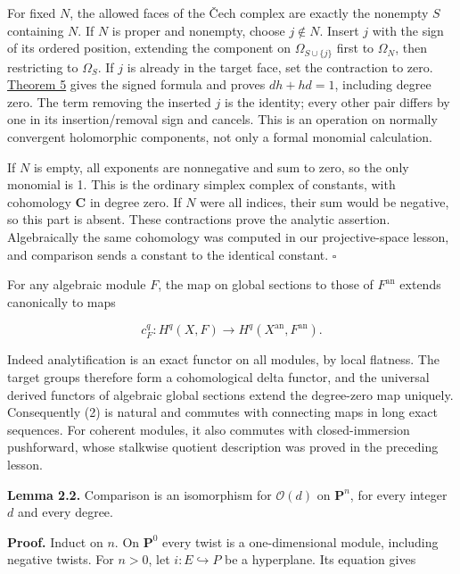 \documentclass[11pt]{article}
\begin{document}
For fixed \(N\), the allowed faces of the Čech complex are exactly the
nonempty \(S\) containing \(N\). If \(N\) is proper and nonempty, choose
\(j\notin N\). Insert \(j\) with the sign of its ordered position,
extending the component on \(\Omega_{S\cup\{j\}}\) first to
\(\Omega_N\), then restricting to \(\Omega_S\). If \(j\) is already in
the target face, set the contraction to zero.
\href{../../human/elementary-analysis/laurent-series-and-homogeneous-projections.html\#4-homogeneous-functions-and-the-ordered-complex}{Theorem
5} gives the signed formula and proves \(dh+hd=1\), including degree
zero. The term removing the inserted \(j\) is the identity; every other
pair differs by one in its insertion/removal sign and cancels. This is
an operation on normally convergent holomorphic components, not only a
formal monomial calculation.

If \(N\) is empty, all exponents are nonnegative and sum to zero, so the
only monomial is 1. This is the ordinary simplex complex of constants,
with cohomology \(\mathbf C\) in degree zero. If \(N\) were all indices,
their sum would be negative, so this part is absent. These contractions
prove the analytic assertion. Algebraically the same cohomology was
computed in our projective-space lesson, and comparison sends a constant
to the identical constant. \(\square\)

For any algebraic module \(F\), the map on global sections to those of
\(F^{\mathrm{an}}\) extends canonically to maps

\[
c_F^q:H^q(X,F)\longrightarrow H^q(X^{\mathrm{an}},F^{\mathrm{an}}).
\tag{2}
\]

Indeed analytification is an exact functor on all modules, by local
flatness. The target groups therefore form a cohomological delta
functor, and the universal derived functors of algebraic global sections
extend the degree-zero map uniquely. Consequently (2) is natural and
commutes with connecting maps in long exact sequences. For coherent
modules, it also commutes with closed-immersion pushforward, whose
stalkwise quotient description was proved in the preceding lesson.

\textbf{Lemma 2.2.} Comparison is an isomorphism for \(\mathcal O(d)\)
on \(\mathbf P^n\), for every integer \(d\) and every degree.

\textbf{Proof.} Induct on \(n\). On \(\mathbf P^0\) every twist is a
one-dimensional module, including negative twists. For \(n>0\), let
\(i:E\hookrightarrow P\) be a hyperplane. Its equation gives
\end{document}

